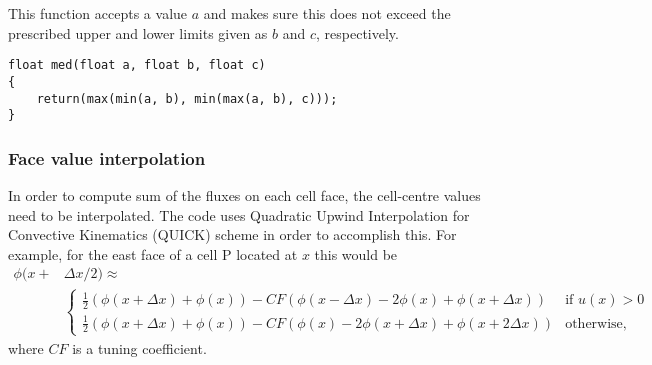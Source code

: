 \documentclass[notitlepage]{article}
\begin{document}
This function accepts a value $a$ and makes sure this does not exceed the prescribed
upper and lower limits given as $b$ and $c$, respectively.

\begin{lstlisting}[style=myCpp]
float med(float a, float b, float c)
{
	return(max(min(a, b), min(max(a, b), c)));
}
\end{lstlisting}

\subsubsection{Face value interpolation}

In order to compute sum of the fluxes on each cell face, the cell-centre values
need to be interpolated.
The code uses Quadratic Upwind Interpolation for Convective Kinematics (QUICK) scheme in order to accomplish this. 
For example, for the east face of a cell P located at $x$ this would be
%
\begin{equation}
\begin{aligned}
\phi(x+&\Delta x/2) \approx \\
&\begin{cases}
	\frac{1}{2}(\phi(x + \Delta x) + \phi(x)) - CF (\phi(x- \Delta x) -2 \phi(x) + \phi(x+\Delta x)) & \mbox{if } u(x)>0 \\
	\frac{1}{2}(\phi(x + \Delta x) + \phi(x)) - CF (\phi(x) -2 \phi(x+\Delta x) + \phi(x+2\Delta x)) & \mbox{otherwise,}
\end{cases} 
\end{aligned}
\end{equation}
%
where $CF$ is a tuning coefficient.
\end{document}
